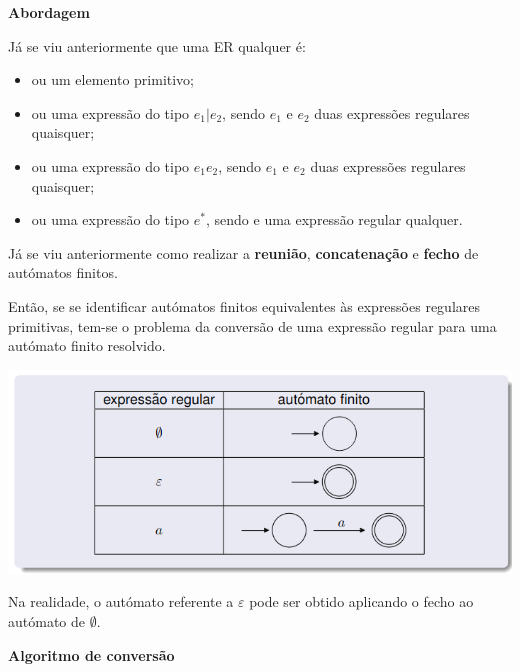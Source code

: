 \documentclass{article}
\begin{document}
\begin{flushleft}
  \textbf{Abordagem}

  \item Já se viu anteriormente que uma ER qualquer é:
  \begin{itemize}
    \item ou um elemento primitivo;
    \item ou uma expressão do tipo \textcolor{BrickRed}{$e_1 | e_2$}, sendo \textcolor{BrickRed}{$e_1$} e
    \textcolor{BrickRed}{$e_2$} duas expressões regulares quaisquer;
    \item ou uma expressão do tipo \textcolor{BrickRed}{$e_1  e_2$}, sendo \textcolor{BrickRed}{$e_1$} e
    \textcolor{BrickRed}{$e_2$} duas expressões regulares quaisquer;
    \item ou uma expressão do tipo \textcolor{BrickRed}{$e^*$}, sendo \textcolor{BrickRed}{e} uma expressão regular qualquer.
  \end{itemize}
  \item Já se viu anteriormente como realizar a \textbf{reunião}, \textbf{concatenação} e \textbf{fecho} de autómatos finitos.
  \item Então, se se identificar autómatos finitos equivalentes às expressões regulares primitivas,
  tem-se o problema da conversão de uma expressão regular para uma autómato finito resolvido.

  \begin{center}
    \includegraphics[scale=0.4]{75}
  \end{center}
  \item Na realidade, o autómato referente a $\varepsilon$ pode ser obtido aplicando o fecho ao autómato de $\emptyset$.
  \break

  \textbf{Algoritmo de conversão}


\end{flushleft}
\end{document}
